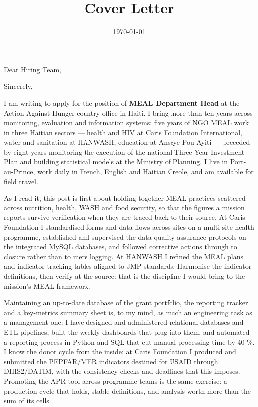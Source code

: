 \documentclass[10pt,a4paper,sans]{moderncv}
\title{Cover Letter}
\begin{document}
\date{\today}
\opening{Dear Hiring Team,}
\closing{Sincerely,}

\makelettertitle

I am writing to apply for the position of \textbf{MEAL Department Head} at the Action Against Hunger country office in Haiti. I bring more than ten years across monitoring, evaluation and information systems: five years of NGO MEAL work in three Haitian sectors --- health and HIV at Caris Foundation International, water and sanitation at HANWASH, education at Anseye Pou Ayiti --- preceded by eight years monitoring the execution of the national Three-Year Investment Plan and building statistical models at the Ministry of Planning. I live in Port-au-Prince, work daily in French, English and Haitian Creole, and am available for field travel.

As I read it, this post is first about holding together MEAL practices scattered across nutrition, health, WASH and food security, so that the figures a mission reports survive verification when they are traced back to their source. At Caris Foundation I standardised forms and data flows across sites on a multi-site health programme, established and supervised the data quality assurance protocols on the integrated MySQL databases, and followed corrective actions through to closure rather than to mere logging. At HANWASH I refined the MEAL plans and indicator tracking tables aligned to JMP standards. Harmonise the indicator definitions, then verify at the source: that is the discipline I would bring to the mission's MEAL framework.

Maintaining an up-to-date database of the grant portfolio, the reporting tracker and a key-metrics summary sheet is, to my mind, as much an engineering task as a management one: I have designed and administered relational databases and ETL pipelines, built the weekly dashboards that plug into them, and automated a reporting process in Python and SQL that cut manual processing time by 40 \%. I know the donor cycle from the inside: at Caris Foundation I produced and submitted the PEPFAR/MER indicators destined for USAID through DHIS2/DATIM, with the consistency checks and deadlines that this imposes. Promoting the APR tool across programme teams is the same exercise: a production cycle that holds, stable definitions, and analysis worth more than the sum of its cells.
\end{document}
